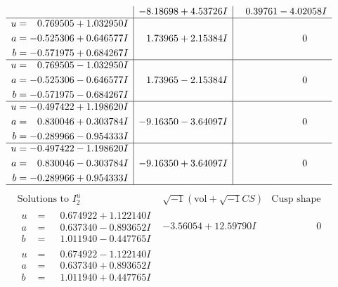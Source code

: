 \documentclass[1p]{elsarticle_modified}
\theoremstyle{definition}
\newcommand{\I}{\sqrt{-1}}
\begin{document}
$$\begin{array}{c|c|c}
 & -8.18698 + 4.53726 I & \phantom{-}0.39761 - 4.02058 I \\ \hline\begin{aligned}
u &= \phantom{-}0.769505 + 1.032950 I \\
a &= -0.525306 + 0.646577 I \\
b &= -0.571975 + 0.684267 I\end{aligned}
 & \phantom{-}1.73965 + 2.15384 I & \phantom{-0.000000 } 0 \\ \hline\begin{aligned}
u &= \phantom{-}0.769505 - 1.032950 I \\
a &= -0.525306 - 0.646577 I \\
b &= -0.571975 - 0.684267 I\end{aligned}
 & \phantom{-}1.73965 - 2.15384 I & \phantom{-0.000000 } 0 \\ \hline\begin{aligned}
u &= -0.497422 + 1.198620 I \\
a &= \phantom{-}0.830046 + 0.303784 I \\
b &= -0.289966 - 0.954333 I\end{aligned}
 & -9.16350 - 3.64097 I & \phantom{-0.000000 } 0 \\ \hline\begin{aligned}
u &= -0.497422 - 1.198620 I \\
a &= \phantom{-}0.830046 - 0.303784 I \\
b &= -0.289966 + 0.954333 I\end{aligned}
 & -9.16350 + 3.64097 I & \phantom{-0.000000 } 0\\
 \hline 
 \end{array}$$\newpage$$\begin{array}{c|c|c}  
\text{Solutions to }I^u_{2}& \I (\text{vol} + \sqrt{-1}CS) & \text{Cusp shape}\\
 \hline 
\begin{aligned}
u &= \phantom{-}0.674922 + 1.122140 I \\
a &= \phantom{-}0.637340 - 0.893652 I \\
b &= \phantom{-}1.011940 - 0.447765 I\end{aligned}
 & -3.56054 + 12.59790 I & \phantom{-0.000000 } 0 \\ \hline\begin{aligned}
u &= \phantom{-}0.674922 - 1.122140 I \\
a &= \phantom{-}0.637340 + 0.893652 I \\
b &= \phantom{-}1.011940 + 0.447765 I\end{aligned}

\end{array}$$
\end{document}
